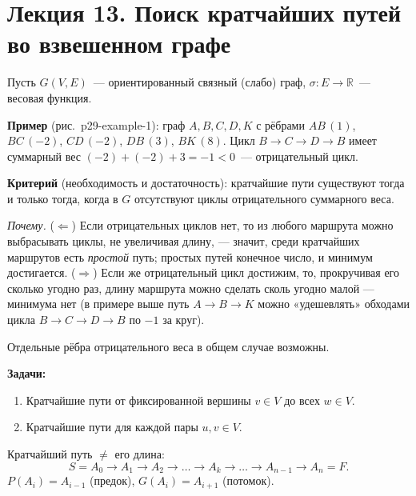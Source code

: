 
\chapter{Лекция 13. Поиск кратчайших путей во взвешенном графе}

Пусть $G(V, E)$~--- ориентированный связный (слабо) граф, $\sigma\colon E \to \mathbb{R}$~--- весовая функция.

\textbf{Пример} (рис.~p29-example-1): граф $A, B, C, D, K$ с рёбрами $AB\,(1)$, $BC\,(-2)$, $CD\,(-2)$, $DB\,(3)$, $BK\,(8)$. Цикл $B \to C \to D \to B$ имеет суммарный вес $(-2) + (-2) + 3 = -1 < 0$~--- отрицательный цикл.


\textbf{Критерий} (необходимость и достаточность): кратчайшие пути существуют тогда и только тогда, когда в $G$ отсутствуют циклы отрицательного суммарного веса.

\textit{Почему.} ($\Leftarrow$) Если отрицательных циклов нет, то из
любого маршрута можно выбрасывать циклы, не увеличивая длину, --- значит,
среди кратчайших маршрутов есть \emph{простой} путь; простых путей
конечное число, и минимум достигается. ($\Rightarrow$) Если же
отрицательный цикл достижим, то, прокручивая его сколько угодно раз,
длину маршрута можно сделать сколь угодно малой --- минимума нет
(в примере выше путь $A \to B \to K$ можно «удешевлять» обходами цикла
$B \to C \to D \to B$ по $-1$ за круг).

Отдельные рёбра отрицательного веса в общем случае возможны.

\textbf{Задачи:}
\begin{enumerate}
  \item[$\oplus$] Кратчайшие пути от фиксированной вершины $v \in V$ до всех $w \in V$.
  \item[$\odot$] Кратчайшие пути для каждой пары $u, v \in V$.
\end{enumerate}

Кратчайший путь $\neq$ его длина:
\[
  S = A_0 \to A_1 \to A_2 \to \ldots \to A_k \to \ldots \to A_{n-1} \to A_n = F.
\]
$P(A_i) = A_{i-1}$ (предок), $G(A_i) = A_{i+1}$ (потомок).


